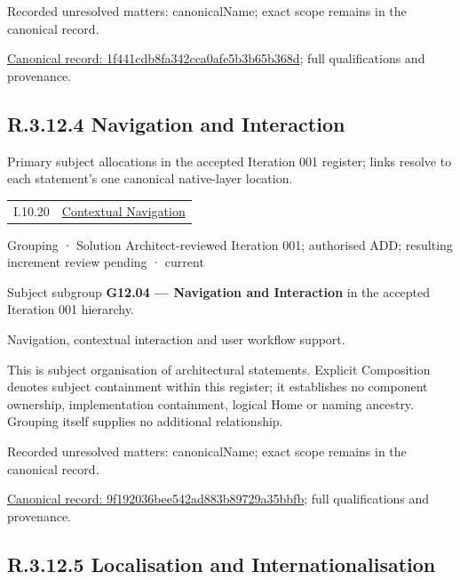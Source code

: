 {\small Recorded unresolved matters: canonicalName; exact scope remains in the canonical record.}\par
{\footnotesize \href{../../../../continuum/grouping/1f441cdb8fa342cca0afe5b3b65b368d.md}{Canonical record: 1f441cdb8fa342cca0afe5b3b65b368d}; full qualifications and provenance.}\par
\subsection*{R.3.12.4 Navigation and Interaction}
\label{navigation:R.3.12.4}

Primary subject allocations in the accepted Iteration 001 register; links resolve to each statement’s one canonical native-layer location.\par
\begin{longtable}{p{.22\linewidth}p{.73\linewidth}}
I.10.20 & \hyperref[element:39d698ff446d48ab9358844666fcafe5]{Contextual Navigation} \\
\end{longtable}
\label{element:9f192036bee542ad883b89729a35bbfb}
{\small Grouping · Solution Architect-reviewed Iteration 001; authorised ADD; resulting increment review pending · current}\par

Subject subgroup \textbf{G12.04 — Navigation and Interaction} in the accepted Iteration 001 hierarchy.



Navigation, contextual interaction and user workflow support.



This is subject organisation of architectural statements. Explicit Composition denotes subject containment within this register; it establishes no component ownership, implementation containment, logical Home or naming ancestry. Grouping itself supplies no additional relationship.


{\small Recorded unresolved matters: canonicalName; exact scope remains in the canonical record.}\par
{\footnotesize \href{../../../../continuum/grouping/9f192036bee542ad883b89729a35bbfb.md}{Canonical record: 9f192036bee542ad883b89729a35bbfb}; full qualifications and provenance.}\par
\subsection*{R.3.12.5 Localisation and Internationalisation}
\label{navigation:R.3.12.5}

